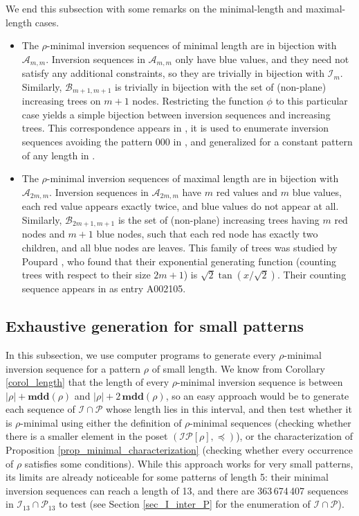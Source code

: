 \documentclass[a4paper,11pt]{article}
\theoremstyle{definition}
\theoremstyle{remark}
\newcommand{\I}{\mathcal{I}}
\renewcommand{\P}{\mathcal{P}}
\newcommand{\mdd}{\mathbf{mdd}}
\begin{document}
We end this subsection with some remarks on the minimal-length and maximal-length cases.
\begin{itemize}
    \item[--] The $\rho$-minimal inversion sequences of minimal length are in bijection with $\mathcal A_{m,m}$. Inversion sequences in $\mathcal A_{m,m}$ only have blue values, and they need not satisfy any additional constraints, so they are trivially in bijection with $\I_m$. Similarly, $\mathcal B_{m+1,m+1}$ is trivially in bijection with the set of (non-plane) increasing trees on $m+1$ nodes.
    Restricting the function $\phi$ to this particular case yields a simple bijection between inversion sequences and increasing trees. This correspondence appears in \cite[page 145]{Flajolet_Sedgewick}, it is used to enumerate inversion sequences avoiding the pattern 000 in \cite{Corteel_Martinez_Savage_Weselcouch_2016}, and generalized for a constant pattern of any length in \cite{Hong_Li_2022}.
    \item[--] The $\rho$-minimal inversion sequences of maximal length are in bijection with $\mathcal A_{2m,m}$. Inversion sequences in $\mathcal A_{2m,m}$ have $m$ red values and $m$ blue values, each red value appears exactly twice, and blue values do not appear at all.
    Similarly, $\mathcal B_{2m+1,m+1}$ is the set of (non-plane) increasing trees having $m$ red nodes and $m+1$ blue nodes, such that each red node has exactly two children, and all blue nodes are leaves. This family of trees was studied by Poupard \cite{Poupard_1989}, who found that their exponential generating function (counting trees with respect to their size $2m+1$) is $\sqrt 2 \tan(x/\sqrt 2)$. Their counting sequence appears in \cite{OEIS} as entry A002105.
\end{itemize}

\subsection{Exhaustive generation for small patterns} \label{sec_exhaustive}
In this subsection, we use computer programs to generate every $\rho$-minimal inversion sequence for a pattern $\rho$ of small length. We know from Corollary \ref{corol_length} that the length of every $\rho$-minimal inversion sequence is between $|\rho| + \mdd(\rho)$ and $|\rho| + 2 \,\mdd(\rho)$, so an easy approach would be to generate each sequence of $\I \cap \P$ whose length lies in this interval, and then test whether it is $\rho$-minimal using either the definition of $\rho$-minimal sequences (checking whether there is a smaller element in the poset $(\I\P[\rho], \preceq)$), or the characterization of Proposition \ref{prop_minimal_characterization} (checking whether every occurrence of $\rho$ satisfies some conditions). While this approach works for very small patterns, its limits are already noticeable for some patterns of length 5: their minimal inversion sequences can reach a length of 13, and there are 363\,674\,407 sequences in $\I_{13} \cap \P_{13}$ to test (see Section \ref{sec_I_inter_P} for the enumeration of $\I \cap \P$). 
\end{document}

